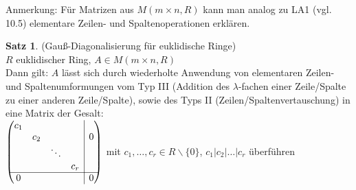 \documentclass[10pt,a4paper,numbers=endperiod]{scrartcl}
\theoremstyle{definition}
\newtheorem{satz}{Satz}[section]
\begin{document}
Anmerkung: Für Matrizen aus $M(m \times n, R)$ kann man analog zu LA1 (vgl. 10.5) elementare Zeilen- und Spaltenoperationen erklären.
\newpage
\begin{satz}
	(Gauß-Diagonalisierung für euklidische Ringe)\\
	$R$ euklidischer Ring, $A \in M(m \times n, R)$\\
	Dann gilt: $A$ lässt sich durch wiederholte Anwendung von elementaren Zeilen- und Spaltenumformungen vom Typ III (Addition des $\lambda$-fachen einer Zeile/Spalte zu einer anderen Zeile/Spalte), sowie des Typs II (Zeilen/Spaltenvertauschung) in eine Matrix der Gesalt:\\
	
	$\begin{pmatrix}
		c_1 & & & & \multicolumn{1}{|c}{}\\
		& c_2 & & &\multicolumn{1}{|c}{0}\\
		& & \ddots & & \multicolumn{1}{|c}{}\\
		& & & c_r  & \multicolumn{1}{|c}{}\\
		\hline
		0 & & & & \multicolumn{1}{|c}{0}
	\end{pmatrix}$ mit $c_1, \ldots, c_r \in R \backslash \{0\}$, $c_1|c_2|\ldots|c_r$ überführen
\end{satz}
\end{document}
